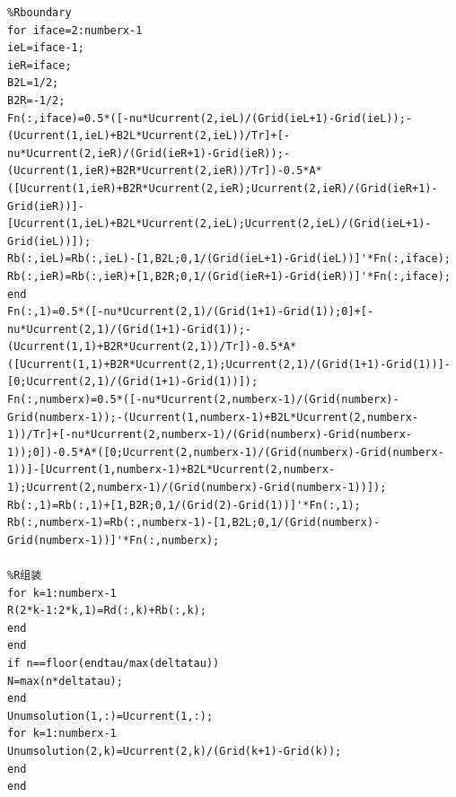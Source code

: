 \documentclass[a4paper,11pt,UTF8]{article}%
\theoremstyle{plain}
\begin{document}
\begin{lstlisting}
%Rboundary
for iface=2:numberx-1
ieL=iface-1;
ieR=iface;
B2L=1/2;
B2R=-1/2;
Fn(:,iface)=0.5*([-nu*Ucurrent(2,ieL)/(Grid(ieL+1)-Grid(ieL));-(Ucurrent(1,ieL)+B2L*Ucurrent(2,ieL))/Tr]+[-nu*Ucurrent(2,ieR)/(Grid(ieR+1)-Grid(ieR));-(Ucurrent(1,ieR)+B2R*Ucurrent(2,ieR))/Tr])-0.5*A*([Ucurrent(1,ieR)+B2R*Ucurrent(2,ieR);Ucurrent(2,ieR)/(Grid(ieR+1)-Grid(ieR))]-[Ucurrent(1,ieL)+B2L*Ucurrent(2,ieL);Ucurrent(2,ieL)/(Grid(ieL+1)-Grid(ieL))]);
Rb(:,ieL)=Rb(:,ieL)-[1,B2L;0,1/(Grid(ieL+1)-Grid(ieL))]'*Fn(:,iface);
Rb(:,ieR)=Rb(:,ieR)+[1,B2R;0,1/(Grid(ieR+1)-Grid(ieR))]'*Fn(:,iface);
end
Fn(:,1)=0.5*([-nu*Ucurrent(2,1)/(Grid(1+1)-Grid(1));0]+[-nu*Ucurrent(2,1)/(Grid(1+1)-Grid(1));-(Ucurrent(1,1)+B2R*Ucurrent(2,1))/Tr])-0.5*A*([Ucurrent(1,1)+B2R*Ucurrent(2,1);Ucurrent(2,1)/(Grid(1+1)-Grid(1))]-[0;Ucurrent(2,1)/(Grid(1+1)-Grid(1))]);
Fn(:,numberx)=0.5*([-nu*Ucurrent(2,numberx-1)/(Grid(numberx)-Grid(numberx-1));-(Ucurrent(1,numberx-1)+B2L*Ucurrent(2,numberx-1))/Tr]+[-nu*Ucurrent(2,numberx-1)/(Grid(numberx)-Grid(numberx-1));0])-0.5*A*([0;Ucurrent(2,numberx-1)/(Grid(numberx)-Grid(numberx-1))]-[Ucurrent(1,numberx-1)+B2L*Ucurrent(2,numberx-1);Ucurrent(2,numberx-1)/(Grid(numberx)-Grid(numberx-1))]);
Rb(:,1)=Rb(:,1)+[1,B2R;0,1/(Grid(2)-Grid(1))]'*Fn(:,1);
Rb(:,numberx-1)=Rb(:,numberx-1)-[1,B2L;0,1/(Grid(numberx)-Grid(numberx-1))]'*Fn(:,numberx);
	
%R组装
for k=1:numberx-1
R(2*k-1:2*k,1)=Rd(:,k)+Rb(:,k);
end
end
if n==floor(endtau/max(deltatau))
N=max(n*deltatau);
end
Unumsolution(1,:)=Ucurrent(1,:);
for k=1:numberx-1
Unumsolution(2,k)=Ucurrent(2,k)/(Grid(k+1)-Grid(k));
end
end
	
\end{lstlisting}
\end{document}
